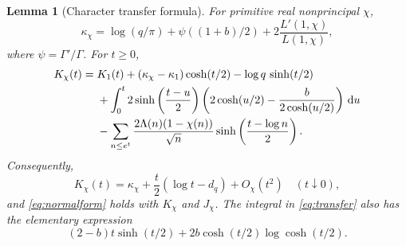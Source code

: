 \documentclass[11pt]{article}
\newtheorem{lemma}[theorem]{Lemma}
\theoremstyle{definition}
\newcommand{\dd}{\,\mathrm d}
\newcommand{\kap}{\kappa}
\begin{document}
\begin{lemma}[Character transfer formula]\label{lem:transfer}
For primitive real nonprincipal $\chi$,
\begin{equation}\label{eq:kappachi}
 \kap_\chi=\log(q/\pi)+\psi((1+b)/2)+2\frac{L'(1,\chi)}{L(1,\chi)},
\end{equation}
where $\psi=\Gamma'/\Gamma$. For $t\ge0$,
\begin{align}\label{eq:transfer}
 K_\chi(t)={}&K_1(t)+(\kap_\chi-\kap_1)\cosh(t/2)-\log q\,\sinh(t/2)\notag\\
 &+\int_0^t2\sinh\left(\frac{t-u}2\right)
       \left(2\cosh(u/2)-\frac{b}{2\cosh(u/2)}\right)\dd u\notag\\
 &-\sum_{n\le e^t}\frac{2\Lambda(n)(1-\chi(n))}{\sqrt n}
             \sinh\left(\frac{t-\log n}2\right).
\end{align}
Consequently,
\begin{equation}\label{eq:localchi}
 K_\chi(t)=\kap_\chi+\frac t2(\log t-d_q)+O_\chi(t^2)
 \quad(t\downarrow0),
\end{equation}
and \cref{eq:normalform} holds with $K_\chi$ and $J_\chi$.
The integral in \cref{eq:transfer} also has the elementary expression
\[
 (2-b)t\sinh(t/2)+2b\cosh(t/2)\log\cosh(t/2).
\]
\end{lemma}
\end{document}
